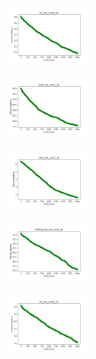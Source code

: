\vspace*{\fill}
\newpage
\vspace*{\fill}

\begin{figure}[H]
    \centering
    \begin{subfigure}
        \centering
        \includegraphics[width=0.234\textwidth]{img/ageun/iris_set_const_10_949004259_cost.png}
    \end{subfigure}
    \hfill
    \begin{subfigure}
        \centering
        \includegraphics[width=0.234\textwidth]{img/ageun/ecoli_set_const_10_949004259_cost.png}
    \end{subfigure}
    \hfill
    \begin{subfigure}
        \centering
        \includegraphics[width=0.234\textwidth]{img/ageun/rand_set_const_10_949004259_cost.png}
    \end{subfigure}
    \hfill
    \begin{subfigure}
        \centering
        \includegraphics[width=0.234\textwidth]{img/ageun/newthyroid_set_const_10_949004259_cost.png}
    \end{subfigure}
    \hfill
    \begin{subfigure}
        \centering
        \includegraphics[width=0.234\textwidth]{img/ageun/iris_set_const_10_589741062_cost.png}

\end{subfigure}
\end{figure}
